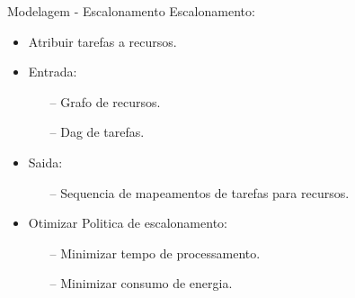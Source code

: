 \begin{frame}{Modelagem - Escalonamento}
    Escalonamento:
    \begin{itemize}
        \item Atribuir tarefas a recursos.
        \item Entrada:
        \begin{itemize}
            \item[--] Grafo de recursos.
            \item[--] Dag de tarefas.
        \end{itemize}
        \item Saida:
        \begin{itemize}
            \item[--] Sequencia de mapeamentos de tarefas para recursos.
        \end{itemize}
        \item Otimizar Politica de escalonamento:
        \begin{itemize}
            \item[--] Minimizar tempo de processamento.
            \item[--] Minimizar consumo de energia.
        \end{itemize}
    \end{itemize}
\end{frame}